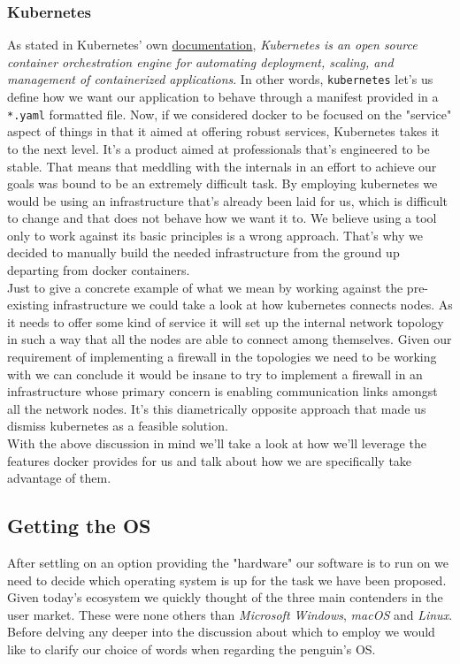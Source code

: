            \subsubsection{Kubernetes}
                As stated in Kubernetes' own \href{https://kubernetes.io/docs/home/}{documentation}, \textit{Kubernetes is an open source container orchestration engine for automating deployment, scaling, and management of containerized applications}. In other words, \texttt{kubernetes} let's us define how we want our application to behave through a manifest provided in a \texttt{*.yaml} formatted file. Now, if we considered docker to be focused on the "service" aspect of things in that it aimed at offering robust services, Kubernetes takes it to the next level. It's a product aimed at professionals that's engineered to be stable. That means that meddling with the internals in an effort to achieve our goals was bound to be an extremely difficult task. By employing kubernetes we would be using an infrastructure that's already been laid for us, which is difficult to change and that does not behave how we want it to. We believe using a tool only to work against its basic principles is a wrong approach. That's why we decided to manually build the needed infrastructure from the ground up departing from docker containers.\\

                Just to give a concrete example of what we mean by working against the pre-existing infrastructure we could take a look at how kubernetes connects nodes. As it needs to offer some kind of service it will set up the internal network topology in such a way that all the nodes are able to connect among themselves. Given our requirement of implementing a firewall in the topologies we need to be working with we can conclude it would be insane to try to implement a firewall in an infrastructure whose primary concern is enabling communication links amongst all the network nodes. It's this diametrically opposite approach that made us dismiss kubernetes as a feasible solution.\\

            With the above discussion in mind we'll take a look at how we'll leverage the features docker provides for us and talk about how we are specifically take advantage of them.

        \subsection{Getting the OS}
            After settling on an option providing the "hardware" our software is to run on we need to decide which operating system is up for the task we have been proposed. Given today's ecosystem we quickly thought of the three main contenders in the user market. These were none others than \textit{Microsoft Windows}, \textit{macOS} and \textit{Linux}. Before delving any deeper into the discussion about which to employ we would like to clarify our choice of words when regarding the penguin's OS.\\

